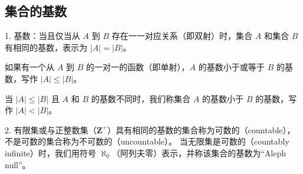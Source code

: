\documentclass[normal,cyan]{elegantnote}
\begin{document}
\subsection{集合的基数}
1. 基数：当且仅当从 $A$ 到 $B$ 存在一一对应关系（即双射）时，集合 $A$ 和集合 $B$ 有相同的基数，表示为 $|A| = |B|$。

如果有一个从 $A$ 到 $B$ 的一对一的函数（即单射），$A$ 的基数小于或等于 $B$ 的基数，写作 $|A| \leq |B|$。

当 $|A| \leq |B|$ 且 $A$ 和 $B$ 的基数不同时，我们称集合 $A$ 的基数小于 $B$ 的基数，写作 $|A| < |B|$。

2. 有限集或与正整数集（$\mathbf{Z}^+$）具有相同的基数的集合称为{\color{red}可数的}（countable），不是可数的集合称为不可数的（uncountable）。
当无限集是可数的（countably infinite）时，我们用符号 $\aleph_0$（阿列夫零）表示，并称该集合的基数为“Aleph null”。
\end{document}
